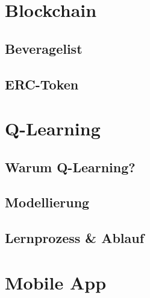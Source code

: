 \section{Blockchain}
\subsection{Beveragelist}
\subsection{ERC-Token}

\section{Q-Learning}
\subsection{Warum Q-Learning?}
\subsection{Modellierung}
\subsection{Lernprozess \& Ablauf}

\section{Mobile App}


